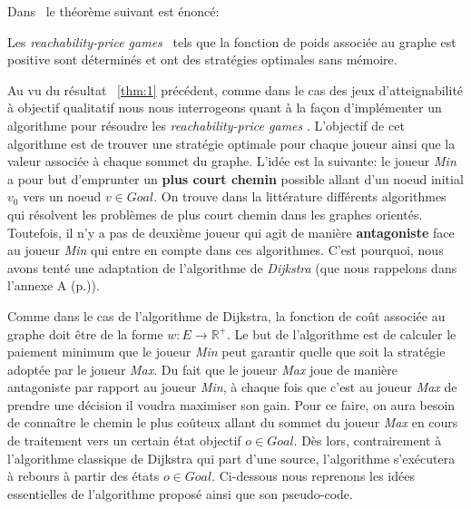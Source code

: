 


Dans~\cite{DBLP:conf/lfcs/BrihayePS13} le théorème suivant est énoncé:

\begin{thm}
	\label{thm:1}
	Les \og\textit{reachability-price games}\fg~ tels que la fonction de poids associée au graphe est positive sont déterminés et ont des stratégies optimales sans mémoire.
\end{thm}


Au vu du résultat ~\ref{thm:1} précédent, comme dans le cas des jeux d'atteignabilité à objectif qualitatif nous nous interrogeons quant à la façon d'implémenter un algorithme pour résoudre les \og \textit{reachability-price games} \fg. L'objectif de cet algorithme est de trouver une stratégie optimale pour chaque joueur ainsi que la valeur associée à chaque sommet du graphe. L'idée est la suivante: le joueur \textit{Min} a pour but d'emprunter un \textbf{plus court chemin} possible allant d'un noeud initial $v_{0}$ vers un noeud $v \in Goal$. On trouve dans la littérature différents algorithmes qui résolvent les problèmes de plus court chemin dans les graphes orientés. Toutefois, il n'y a pas de deuxième joueur qui agit de manière \textbf{antagoniste} face au joueur \textit{Min} qui entre en compte dans ces algorithmes. C'est pourquoi, nous avons tenté une adaptation de l'algorithme de \textit{Dijkstra} (que nous rappelons dans l'annexe A (p.\pageref{algo:dijkstra})).

Comme dans le cas de l'algorithme de Dijkstra, la fonction de coût associée au graphe doit être de la forme $w : E \rightarrow \mathbb{R}^{+}$. Le but de l'algorithme est de calculer le paiement minimum que le joueur \textit{Min} peut garantir quelle que soit la stratégie adoptée par le joueur \textit{Max}. Du fait que le joueur \textit{Max} joue de manière antagoniste par rapport au joueur \textit{Min}, à chaque fois que c'est au joueur \textit{Max} de prendre une décision il voudra maximiser son gain. Pour ce faire, on aura besoin de connaître le chemin le plus coûteux allant du sommet du joueur \textit{Max} en cours de traitement vers un certain état objectif $o \in Goal$. Dès lors, contrairement à l'algorithme classique de Dijkstra qui part d'une source, l'algorithme s'exécutera à rebours à partir des états $o \in Goal$. Ci-dessous nous reprenons les idées essentielles de l'algorithme proposé ainsi que son pseudo-code.\\

